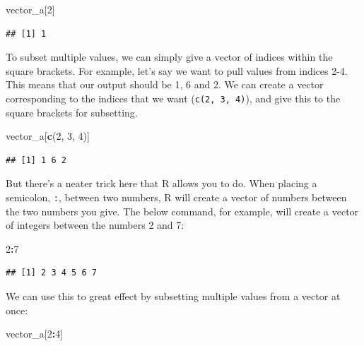 \documentclass[
]{book}
\newenvironment{Shaded}{\begin{snugshade}}{\end{snugshade}}
\newcommand{\DecValTok}[1]{\textcolor[rgb]{0.00,0.00,0.81}{#1}}
\newcommand{\FunctionTok}[1]{\textcolor[rgb]{0.13,0.29,0.53}{\textbf{#1}}}
\newcommand{\NormalTok}[1]{#1}
\newcommand{\SpecialCharTok}[1]{\textcolor[rgb]{0.81,0.36,0.00}{\textbf{#1}}}
\begin{document}
\begin{Shaded}
\begin{Highlighting}[]
\NormalTok{vector\_a[}\DecValTok{2}\NormalTok{]}
\end{Highlighting}
\end{Shaded}

\begin{verbatim}
## [1] 1
\end{verbatim}

To subset multiple values, we can simply give a vector of indices within the square brackets. For example, let's say we want to pull values from indices 2-4. This means that our output should be 1, 6 and 2. We can create a vector corresponding to the indices that we want (\texttt{c(2,\ 3,\ 4)}), and give this to the square brackets for subsetting.

\begin{Shaded}
\begin{Highlighting}[]
\NormalTok{vector\_a[}\FunctionTok{c}\NormalTok{(}\DecValTok{2}\NormalTok{, }\DecValTok{3}\NormalTok{, }\DecValTok{4}\NormalTok{)]}
\end{Highlighting}
\end{Shaded}

\begin{verbatim}
## [1] 1 6 2
\end{verbatim}

But there's a neater trick here that R allows you to do. When placing a semicolon, \texttt{:}, between two numbers, R will create a vector of numbers between the two numbers you give. The below command, for example, will create a vector of integers between the numbers 2 and 7:

\begin{Shaded}
\begin{Highlighting}[]
\DecValTok{2}\SpecialCharTok{:}\DecValTok{7}
\end{Highlighting}
\end{Shaded}

\begin{verbatim}
## [1] 2 3 4 5 6 7
\end{verbatim}

We can use this to great effect by subsetting multiple values from a vector at once:

\begin{Shaded}
\begin{Highlighting}[]
\NormalTok{vector\_a[}\DecValTok{2}\SpecialCharTok{:}\DecValTok{4}\NormalTok{]}
\end{Highlighting}
\end{Shaded}
\end{document}
